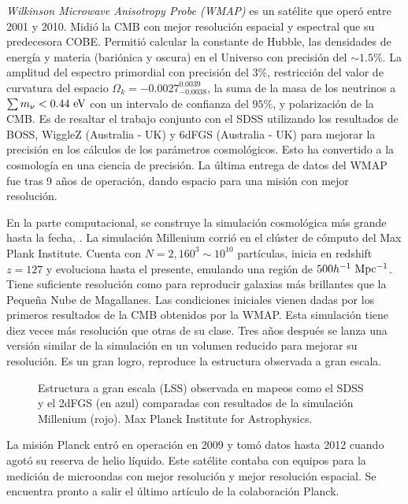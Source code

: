 \documentclass[preprint]{aastex62}
\begin{document}
  \textit{Wilkinson Microwave Anisotropy Probe (WMAP)} es un satélite que operó entre 2001 y 2010.
  Midió la CMB con mejor resolución espacial y espectral que su predecesora COBE. Permitió calcular
  la constante de Hubble, las densidades de energía y materia (bariónica y oscura) en
  el Universo con precisión del $\sim 1.5\%$. La amplitud del espectro primordial con precisión del
  $3\%$, restricción del valor de curvatura del espacio $\Omega_k = -0.0027^{0.0039}_{-0.0038}$, la suma
  de la masa de los neutrinos a $\sum m_\nu < 0.44 \rm~eV$ con un intervalo de confianza del $95\%$,
  y polarización de la CMB. Es de resaltar el trabajo conjunto con el SDSS utilizando los resultados
  de BOSS, WiggleZ (Australia - UK) y 6dFGS (Australia - UK) para mejorar la precisión en los cálculos
  de los parámetros cosmológicos. Esto ha convertido a la cosmología en una ciencia de precisión.
  La última entrega de datos del WMAP fue tras 9 años de operación, dando espacio para una misión con
  mejor resolución. \citep{WMAP2013}

  
  En la parte computacional, se construye la simulación cosmológica más grande hasta la fecha,
  \citep{Springel2005}. La simulación Millenium corrió en el clúster de cómputo del Max Plank Institute.
  Cuenta con $N = 2,160^3\sim 10^{10}$ partículas, inicia en redshift $z=127$ y
  evoluciona hasta el presente, emulando una región de $500 h^{-1} \rm~Mpc^{-1}$. Tiene suficiente
  resolución como para reproducir galaxias más brillantes que la Pequeña Nube de Magallanes. Las
  condiciones iniciales vienen dadas por los primeros resultados de la CMB obtenidos por la WMAP.
  Esta simulación tiene diez veces más resolución que otras de su clase. Tres años después se lanza
  una versión similar de la simulación en un volumen reducido para mejorar su resolución. Es un gran
  logro, reproduce la estructura observada a gran escala.

  \begin{figure}
    \caption{Estructura a gran escala (LSS) observada en mapeos como el SDSS y el 2dFGS (en azul)
      comparadas con resultados de la simulación Millenium (rojo).
      Max Planck Institute for Astrophysics.
      \label{fig:pie_millenium_walls}}
  \end{figure}
  

  La misión Planck entró en operación en 2009 y tomó datos hasta 2012 cuando agotó su reserva de helio
  líquido. Este satélite contaba con equipos para la medición de microondas con mejor resolución y
  mejor resolución espacial. Se encuentra pronto a salir el último artículo de la colaboración Planck.
  
\end{document}

